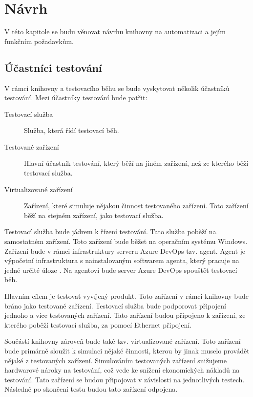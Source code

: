 \chapter{Návrh}

V této kapitole se budu věnovat návrhu knihovny na automatizaci a jejím funkčním požadavkům.

\section{Účastníci testování}
V rámci knihovny a testovacího běhu se bude vyskytovat několik účastníků testování. Mezi účastníky testování bude patřit:

\begin{description}
    \item[Testovací služba] Služba, která řídí testovací běh.
    \item[Testované zařízení] Hlavní účastník testování, který běží na jiném zařízení, než ze kterého běží testovací služba. 
    \item[Virtualizované zařízení] Zařízení, které simuluje nějakou činnost testovaného zařízení. Toto zařízení běží na stejném zařízení, jako testovací služba. 
\end{description}

Testovací služba bude jádrem k řízení testování. Tato služba poběží na samostatném zařízení. Toto zařízení bude běžet na operačním systému Windows. Zařízení bude v rámci infrastruktury serveru Azure DevOps tzv. agent. Agent je výpočetní infrastruktura s nainstalovaným softwarem agenta, který pracuje na jedné určité úloze \cite{agent_docs}. Na agentovi bude server Azure DevOps spouštět testovací běh.

Hlavním cílem je testovat vyvíjený produkt. Toto zařízení v rámci knihovny bude bráno jako testované zařízení. Testovací služba bude podporovat připojení jednoho a více testovaných zařízení. Tato zařízení budou připojeno k zařízení, ze kterého poběží testovací služba, za pomocí Ethernet připojení. 

Součástí knihovny zároveň bude také tzv. virtualizované zařízení. Toto zařízení bude primárně sloužit k simulaci nějaké činnosti, kterou by jinak muselo provádět nějaké z testovaných zařízení. Simulováním testovaných zařízení snižujeme hardwarové nároky na testování, což vede ke snížení ekonomických nákladů na testování. Tato zařízení se budou připojovat v závislosti na jednotlivých testech. Následně po skončení testu budou tato zařízení odpojena.


